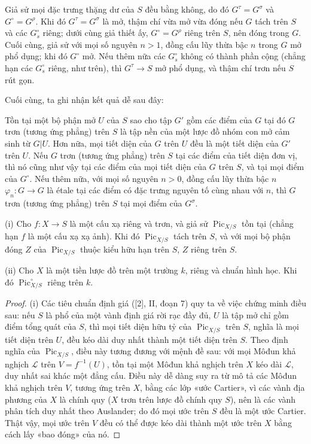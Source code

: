  Giả sử mọi đặc trưng thặng dư của $S$ đều bằng không,
do đó $G^\tau=G^\sigma$ và $G^\circ=G^\rho$. Khi đó $G^\tau=G^\sigma$ là mở,
thậm chí vừa mở vừa đóng nếu $G$ tách trên $S$ và các $G_s^\circ$ riêng; dưới
cùng giả thiết ấy, $G^\circ=G^\rho$ riêng trên $S$, nên đóng trong $G$. Cuối
cùng, giả sử với mọi số nguyên $n>1$, đồng cấu lũy thừa bậc $n$ trong $G$ mở
phổ dụng; khi đó $G^\circ$ mở. Nếu thêm nữa các $G_s^\circ$ không có thành
phần cộng (chẳng hạn các $G_s^\circ$ riêng, như trên), thì
$G^\tau\longrightarrow S$ mở phổ dụng, và thậm chí trơn nếu $S$ rút gọn.

Cuối cùng, ta ghi nhận kết quả dễ sau đây:

 Tồn tại một bộ phận mở $U$ của $S$ sao cho tập $G'$ gồm
các điểm của $G$ tại đó $G$ trơn (tương ứng phẳng) trên $S$ là tập nền của một
lược đồ nhóm con mở cảm sinh từ $G|U$. Hơn nữa, mọi tiết diện của $G$ trên $U$
đều là một tiết diện của $G'$ trên $U$.
 Nếu $G$ trơn (tương ứng phẳng) trên $S$ tại các điểm của
tiết diện đơn vị, thì nó cũng như vậy tại các điểm của mọi tiết diện của $G$
trên $S$, và tại mọi điểm của $G^\circ$. Nếu thêm nữa, với mọi số nguyên
$n>0$, đồng cấu lũy thừa bậc $n$
$\varphi_n:G\longrightarrow G$ là étale tại các điểm có đặc trưng nguyên tố
cùng nhau với $n$, thì $G$ trơn (tương ứng phẳng) trên $S$ tại mọi điểm của
$G^\sigma$.



\noindent(i) Cho $f:X\longrightarrow S$ là một cấu xạ riêng và trơn, và giả
sử $\operatorname{Pic}_{X/S}$ tồn tại (chẳng hạn $f$ là một cấu xạ xạ ảnh).
Khi đó $\operatorname{Pic}_{X/S}$ tách trên $S$, và với mọi bộ phận đóng $Z$
của $\operatorname{Pic}_{X/S}$ thuộc kiểu hữu hạn trên $S$, $Z$ riêng trên
$S$.

\noindent(ii) Cho $X$ là một tiền lược đồ trên một trường $k$, riêng và chuẩn
hình học. Khi đó $\operatorname{Pic}_{X/S}^\circ$ riêng trên $k$.

\begin{proof}
(i) Các tiêu chuẩn định giá ([2], II, đoạn 7) quy ta về việc chứng minh điều
sau: nếu $S$ là phổ của một vành định giá rời rạc đầy đủ, $U$ là tập mở chỉ
gồm điểm tổng quát của $S$, thì mọi tiết diện hữu tỷ của
$\operatorname{Pic}_{X/S}$ trên $S$, nghĩa là mọi tiết diện trên $U$, đều kéo
dài duy nhất thành một tiết diện trên $S$. Theo định nghĩa của
$\operatorname{Pic}_{X/S}$, điều này tương đương với mệnh đề sau: với mọi
Môđun khả nghịch $\mathcal L$ trên $V=f^{-1}(U)$, tồn tại một Môđun khả nghịch
trên $X$ kéo dài $\mathcal L$, duy nhất sai khác một đẳng cấu. Điều này dễ dàng
suy ra từ mô tả các Môđun khả nghịch trên $V$, tương ứng trên $X$, bằng các
lớp «ước Cartier», vì các vành địa phương của $X$ là chính quy ($X$ trơn trên
lược đồ chính quy $S$), nên là các vành phân tích duy nhất theo Auslander; do
đó mọi ước trên $S$ đều là một ước
Cartier. Thật vậy, mọi ước trên $V$ đều có thể được kéo dài thành một ước trên
$X$ bằng cách lấy «bao đóng» của nó.
\end{proof}

